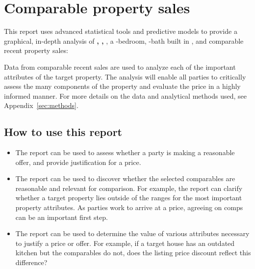\documentclass[
12pt, %
letterpaper, %
oneside, %
headinclude,footinclude, %
BCOR5mm, %
]{scrartcl}
\begin{document}


\section{Comparable property sales}
This report uses advanced statistical tools and predictive models to provide a graphical, in-depth analysis of 
\textbf{\PropertyName{}, \PropertyCity{}, \PropertyState{}}, 
a \NumberOfBedrooms{}-bedroom, \NumberOfBaths{}-bath 
\PropertyType{} built in \PropertyYearBuilt{}, and \NumberOfComps{} comparable recent property sales:


Data from comparable recent sales are used to analyze each of the important attributes of the target property. The analysis will enable all parties to critically assess the many components of the property and evaluate the price in a highly informed manner.
\newline For more details on the data and analytical methods used, see Appendix~\ref{sec:methods}.

\subsection{How to use this report}
\begin{itemize}
\item The report can be used to assess whether a party is making a reasonable offer, and provide justification for a price. 
\item The report can be used to discover whether the selected comparables are reasonable and relevant for comparison. For example, the report can clarify whether a target property lies outside of the ranges for the most important property attributes. As parties work to arrive at a price, agreeing on comps can be an important first step. 
\item The report can be used to determine the value of various attributes necessary to justify a price or offer. For example, if a target house has an outdated kitchen but the comparables do not, does the listing price discount reflect this difference? 
\end{itemize} 
\end{document}
